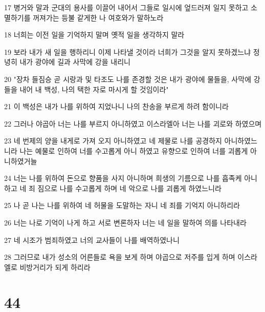 \par 17 병거와 말과 군대의 용사를 이끌어 내어서 그들로 일시에 엎드러져 일지 못하고 소멸하기를 꺼져가는 등불 같게한 나 여호와가 말하노라
\par 18 너희는 이전 일을 기억하지 말며 옛적 일을 생각하지 말라
\par 19 보라 내가 새 일을 행하리니 이제 나타낼 것이라 너희가 그것을 알지 못하겠느냐 정녕히 내가 광야에 길과 사막에 강을 내리니
\par 20 "장차 들짐승 곧 시랑과 및 타조도 나를 존경할 것은 내가 광야에 물들을, 사막에 강들을 내어 내 백성, 나의 택한 자로 마시게 할 것임이라"
\par 21 이 백성은 내가 나를 위하여 지었나니 나의 찬송을 부르게 하려 함이니라
\par 22 그러나 야곱아 너는 나를 부르지 아니하였고 이스라엘아 너는 나를 괴로와 하였으며
\par 23 네 번제의 양을 내게로 가져 오지 아니하였고 네 제물로 나를 공경하지 아니하였느니라 나는 예물로 인하여 너를 수고롭게 아니 하였고 유향으로 인하여 너를 괴롭게 아니하였거늘
\par 24 너는 나를 위하여 돈으로 향품을 사지 아니하며 희생의 기름으로 나를 흡족케 아니하고 네 죄 짐으로 나를 수고롭게 하며 네 악으로 나를 괴롭게 하였느니라
\par 25 나 곧 나는 나를 위하여 네 허물을 도말하는 자니 네 죄를 기억지 아니하리라
\par 26 너는 나로 기억이 나게 하고 서로 변론하자 너는 네 일을 말하여 의를 나타내라
\par 27 네 시조가 범죄하였고 너의 교사들이 나를 배역하였나니
\par 28 그러므로 내가 성소의 어른들로 욕을 보게 하며 야곱으로 저주를 입게 하며 이스라엘로 비방거리가 되게 하리라

\chapter{44}

